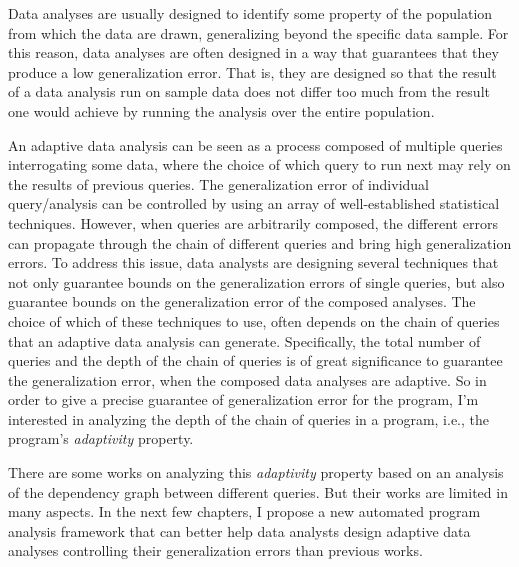 
Data analyses are usually designed to identify some property of the population 
from which the data are drawn, generalizing beyond the specific data sample. 
For this reason, data analyses are often designed in a way that guarantees that they produce a low generalization error.
That is, they are designed so that the result of a data analysis run on sample data does not differ too much from the result one would achieve by running the analysis over the entire population. 

An adaptive data analysis can be seen as a process composed of multiple queries interrogating some data, where the choice of which query to run next may rely on the results of previous queries. 
The generalization error of individual query/analysis can be controlled by using an array of well-established statistical techniques.
However, when queries are arbitrarily composed, the different errors can propagate through the chain of different queries and bring high generalization errors. 
To address this issue, data analysts are designing several techniques that not only guarantee bounds on the generalization errors of single queries, but also guarantee bounds on the generalization error of the composed analyses. 
The choice of which of these techniques to use, 
often depends on the chain of queries that an adaptive data analysis can generate.
Specifically, the total number of queries and the depth of the chain of queries is of great significance 
to guarantee the generalization error, 
when the composed data analyses are adaptive. 
So in order to give a precise guarantee of generalization error
for the program,
I'm interested in analyzing the depth of the chain of queries in a program, i.e., the program's \emph{adaptivity} property.

There are some works on analyzing this \emph{adaptivity} property based on an analysis of the dependency graph between different queries.
But their works are limited in many aspects.
In the next few chapters,
I propose a new automated program analysis framework that can better help data analysts
design adaptive data analyses controlling their generalization errors than previous works.




